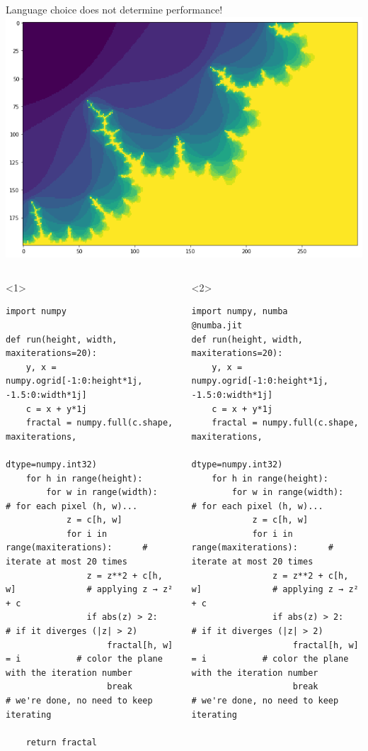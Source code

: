 \documentclass[aspectratio=169]{beamer}
\begin{document}
\begin{frame}[fragile]{Language choice does not determine performance!}
\vspace{0.25 cm}
\hfill\mbox{\includegraphics[height=3 cm]{img/performance-test-fractal.png}\hspace{-0.25 cm}}

\vspace{-2.5 cm}
\scriptsize
\begin{columns}
\begin{onlyenv}<1>
\begin{verbatim}
import numpy

def run(height, width, maxiterations=20):
    y, x = numpy.ogrid[-1:0:height*1j, -1.5:0:width*1j]
    c = x + y*1j
    fractal = numpy.full(c.shape, maxiterations,
                                  dtype=numpy.int32)
    for h in range(height):
        for w in range(width):                  # for each pixel (h, w)...
            z = c[h, w]
            for i in range(maxiterations):      # iterate at most 20 times
                z = z**2 + c[h, w]              # applying z → z² + c
                if abs(z) > 2:                  # if it diverges (|z| > 2)
                    fractal[h, w] = i           # color the plane with the iteration number
                    break                       # we're done, no need to keep iterating

    return fractal
\end{verbatim}
\end{onlyenv}
\begin{onlyenv}<2>
\begin{verbatim}
import numpy, numba
@numba.jit
def run(height, width, maxiterations=20):
    y, x = numpy.ogrid[-1:0:height*1j, -1.5:0:width*1j]
    c = x + y*1j
    fractal = numpy.full(c.shape, maxiterations,
                                  dtype=numpy.int32)
    for h in range(height):
        for w in range(width):                  # for each pixel (h, w)...
            z = c[h, w]
            for i in range(maxiterations):      # iterate at most 20 times
                z = z**2 + c[h, w]              # applying z → z² + c
                if abs(z) > 2:                  # if it diverges (|z| > 2)
                    fractal[h, w] = i           # color the plane with the iteration number
                    break                       # we're done, no need to keep iterating


\end{verbatim}
\end{onlyenv}
\end{columns}
\end{frame}
\end{document}
